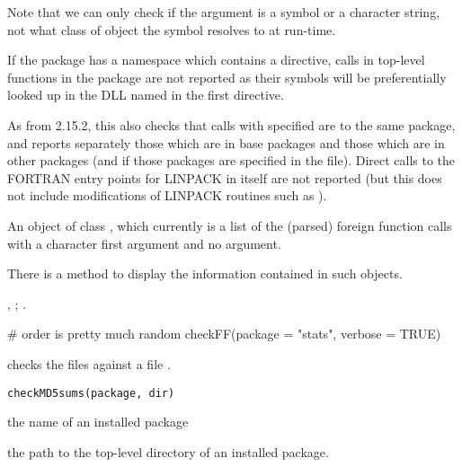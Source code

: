 %
\begin{Details}\relax
Note that we can only check if the  argument is a symbol or
a character string, not what class of object the symbol resolves to
at run-time.

If the package has a namespace which contains a 
directive, calls in top-level functions in the package are not
reported as their symbols will be preferentially looked up in the DLL
named in the first  directive.

As from \R{} 2.15.2, this also checks that calls with 
specified are to the same package, and reports separately those which
are in base packages and those which are in other packages (and if
those packages are specified in the  file).  Direct
calls to the FORTRAN entry points for LINPACK in \R{} itself are not
reported (but this does not include modifications of LINPACK routines
such as ).
\end{Details}
%
\begin{Value}
An object of class , which currently is a list of the
(parsed) foreign function calls with a character first argument and
no  argument.

There is a  method to display the information contained in
such objects.
\end{Value}
%
\begin{SeeAlso}\relax
{},
;
.
\end{SeeAlso}
%
\begin{Examples}
\begin{ExampleCode}
 # order is pretty much random
checkFF(package = "stats", verbose = TRUE)
\end{ExampleCode}
\end{Examples}
%
\begin{Description}\relax
{} checks the files against a file .
\end{Description}
%
\begin{Usage}
\begin{verbatim}
checkMD5sums(package, dir)
\end{verbatim}
\end{Usage}
%
\begin{Arguments}
\begin{ldescription}
\item[\code{package}] the name of an installed package
\item[\code{dir}] the path to the top-level directory of an installed
package.
\end{ldescription}
\end{Arguments}
